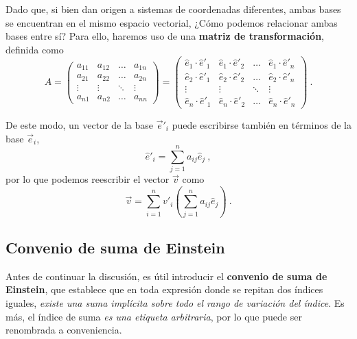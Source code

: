 Dado que, si bien dan origen a sistemas de coordenadas diferentes, ambas bases se encuentran en el mismo espacio vectorial, ¿Cómo podemos relacionar ambas bases entre sí? Para ello, haremos uso de una \textbf{matriz de transformación}, definida como
\begin{equation}
    A = \begin{pmatrix}
        a_{11} & a_{12} & \dots & a_{1n} \\
        a_{21} & a_{22} & \dots & a_{2n} \\
        \vdots & \vdots & \ddots & \vdots \\
        a_{n1} & a_{n2} & \dots & a_{nn}
    \end{pmatrix} =
    \begin{pmatrix}
        \hat{e}_1 \cdot \hat{e}'_1 & \hat{e}_1 \cdot \hat{e}'_2 & \dots & \hat{e}_1 \cdot \hat{e}'_n \\
        \hat{e}_2 \cdot \hat{e}'_1 & \hat{e}_2 \cdot \hat{e}'_2 & \dots & \hat{e}_2 \cdot \hat{e}'_n \\
        \vdots & \vdots & \ddots & \vdots \\
        \hat{e}_n \cdot \hat{e}'_1 & \hat{e}_n \cdot \hat{e}'_2 & \dots & \hat{e}_n \cdot \hat{e}'_n
    \end{pmatrix} \ .
\end{equation}

De este modo, un vector de la base $\vec{e}'_i$ puede escribirse también en términos de la base $\vec{e}_i$,
\begin{equation} \label{eq:transformacion-coordenadas}
    \hat{e}'_i = \sum_{j=1}^n a_{ij} \hat{e}_j \ ,
\end{equation}
por lo que podemos reescribir el vector $\vec{v}$ como
\begin{equation} \label{eq:transformacion-vector}
    \vec{v} = \sum_{i=1}^n v'_i \left( \sum_{j=1}^n a_{ij} \hat{e}_j \right) \ .
\end{equation}

\subsection{Convenio de suma de Einstein}

Antes de continuar la discusión, es útil introducir el  \textbf{convenio de suma de Einstein}, que establece que en toda expresión donde se repitan dos índices iguales, \emph{existe una suma implícita sobre todo el rango de variación del índice}. Es más, el índice de suma \emph{es una etiqueta arbitraria}, por lo que puede ser renombrada a conveniencia.

